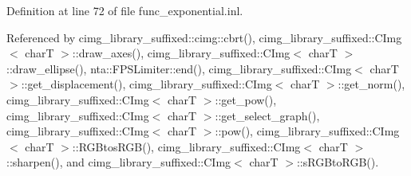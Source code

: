 Definition at line 72 of file func\+\_\+exponential.\+inl.



Referenced by cimg\+\_\+library\+\_\+suffixed\+::cimg\+::cbrt(), cimg\+\_\+library\+\_\+suffixed\+::\+C\+Img$<$ char\+T $>$\+::draw\+\_\+axes(), cimg\+\_\+library\+\_\+suffixed\+::\+C\+Img$<$ char\+T $>$\+::draw\+\_\+ellipse(), nta\+::\+F\+P\+S\+Limiter\+::end(), cimg\+\_\+library\+\_\+suffixed\+::\+C\+Img$<$ char\+T $>$\+::get\+\_\+displacement(), cimg\+\_\+library\+\_\+suffixed\+::\+C\+Img$<$ char\+T $>$\+::get\+\_\+norm(), cimg\+\_\+library\+\_\+suffixed\+::\+C\+Img$<$ char\+T $>$\+::get\+\_\+pow(), cimg\+\_\+library\+\_\+suffixed\+::\+C\+Img$<$ char\+T $>$\+::get\+\_\+select\+\_\+graph(), cimg\+\_\+library\+\_\+suffixed\+::\+C\+Img$<$ char\+T $>$\+::pow(), cimg\+\_\+library\+\_\+suffixed\+::\+C\+Img$<$ char\+T $>$\+::\+R\+G\+Btos\+R\+G\+B(), cimg\+\_\+library\+\_\+suffixed\+::\+C\+Img$<$ char\+T $>$\+::sharpen(), and cimg\+\_\+library\+\_\+suffixed\+::\+C\+Img$<$ char\+T $>$\+::s\+R\+G\+Bto\+R\+G\+B().

